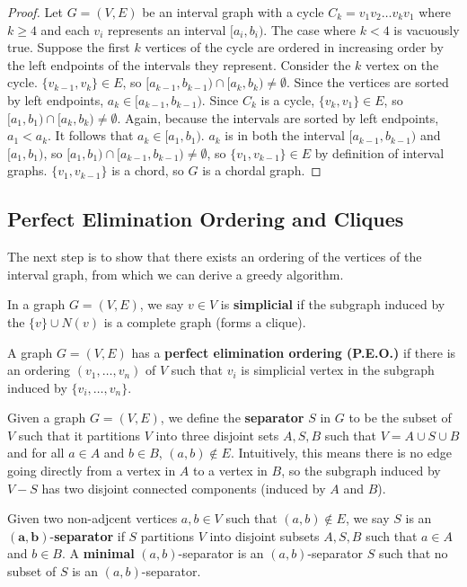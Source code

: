 \begin{proof}
    Let $G=(V,E)$ be an interval graph with a cycle $C_k = v_1v_2\ldots v_kv_1$ where $k \geq 4$ and each $v_i$ represents an interval $[a_i,b_i)$. The case where $k < 4$ is vacuously true. Suppose the first $k$ vertices of the cycle are ordered in increasing order by the left endpoints of the intervals they represent. Consider the $k$ vertex on the cycle. $\{v_{k-1},v_k\} \in E$, so $[a_{k-1},b_{k-1}) \cap [a_k,b_k) \neq \emptyset$. Since the vertices are sorted by left endpoints, $a_k \in [a_{k-1},b_{k-1})$. Since $C_k$ is a cycle, $\{v_k,v_1\} \in E$, so $[a_1,b_1) \cap [a_k,b_k) \neq \emptyset$. Again, because the intervals are sorted by left endpoints, $a_1 < a_k$. It follows that $a_k \in [a_1,b_1)$. $a_k$ is in both the interval $[a_{k-1},b_{k-1})$ and $[a_1,b_1)$, so $[a_1,b_1) \cap [a_{k-1},b_{k-1}) \neq \emptyset$, so $\{v_1,v_{k-1}\} \in E$ by definition of interval graphs. $\{v_1,v_{k-1}\}$ is a chord, so $G$ is a chordal graph.
\end{proof}

\subsection{Perfect Elimination Ordering and Cliques}

The next step is to show that there exists an ordering of the vertices of the interval graph, from which we can derive a greedy algorithm.

\begin{definition}
    In a graph $G=(V,E)$, we say $v \in V$ is \textbf{simplicial} if the subgraph induced by the $\{v\} \cup N(v)$ is a complete graph (forms a clique).
\end{definition}

\begin{definition}
    A graph $G=(V,E)$ has a \textbf{perfect elimination ordering (P.E.O.)} if there is an ordering $(v_1,\ldots,v_n)$ of $V$ such that $v_i$ is simplicial vertex in the subgraph induced by $\{v_i,\ldots,v_n\}$. 
\end{definition}

\begin{definition}
    Given a graph $G=(V,E)$, we define the \textbf{separator} $S$ in $G$ to be the subset of $V$ such that it partitions $V$ into three disjoint sets $A,S,B$ such that $V=A\cup S \cup B$ and for all $a \in A$ and $b \in B$, $(a,b) \not\in E$. Intuitively, this means there is no edge going directly from a vertex in $A$ to a vertex in $B$, so the subgraph induced by $V-S$ has two disjoint connected components (induced by $A$ and $B$).

    Given two non-adjcent vertices $a,b \in V$ such that $(a,b) \not\in E$, we say $S$ is an $\mathbf{(a,b)}$-\textbf{separator} if $S$ partitions $V$ into disjoint subsets $A,S,B$ such that $a \in A$ and $b \in B$. A \textbf{minimal} $(a,b)$-separator is an $(a,b)$-separator $S$ such that no subset of $S$ is an $(a,b)$-separator.
\end{definition}

